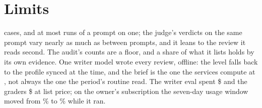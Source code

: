 \documentclass[11pt]{article}
\begin{document}
\section{Limits}

\CasesCap{} cases, and at most \MaxReps{} runs of a prompt on one; the judge's verdicts on the same prompt vary
nearly as much as between prompts, and it leans to the review it reads second. The audit's counts
are a floor, and a share of what it lists holds by its own evidence. One writer model wrote every
review, offline: the level falls back to the profile synced at the time, and the brief is the one
the services compute at \texttt{\AppCommit}, not always the one the period's routine read. The
writer eval spent \$\WriterSpend{} and the graders \$\GraderSpend{} at list price; on the owner's
subscription the seven-day usage window moved from \SevenDayFirst\% to \SevenDayLast\% while it ran.
\end{document}
